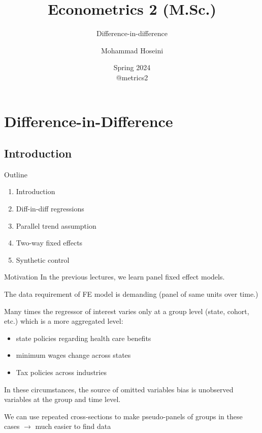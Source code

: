 \documentclass{beamer}
\begin{document}
	\title[Econometrics 2]{Econometrics 2 (M.Sc.)}
	\subtitle{Difference-in-difference}
	\author[Mohammad Hoseini]{Mohammad Hoseini}
	
	
	
\date[Spring 2024]{Spring 2024 \\
	\vspace{10pt} @metrics2
}

	
\begin{frame}[plain]
	\titlepage
\end{frame}

\section{Difference-in-Difference}
\subsection{Introduction}

\begin{frame}{Outline}

\begin{enumerate}
	\item Introduction
	\item Diff-in-diff regressions
	\item Parallel trend assumption
	\item Two-way fixed effects
	\item Synthetic control 	
\end{enumerate}\bigskip


\end{frame}

\begin{frame}{Motivation}
In the previous lectures, we learn panel fixed effect models. \medskip

The data requirement of FE model is demanding (panel of same units over time.)\medskip

Many times the regressor of interest varies only at a group level (state, cohort, etc.) which is a more aggregated level:
\begin{itemize}
\item state policies regarding health care benefits
\item minimum wages change across states
\item Tax policies across industries
\end{itemize}
In these circumstances, the source of omitted variables bias is unobserved variables at the group and time level.\medskip

We can use repeated cross-sections to make pseudo-panels of groups in these cases $\rightarrow$ much easier to find data
\end{frame}
\end{document}
